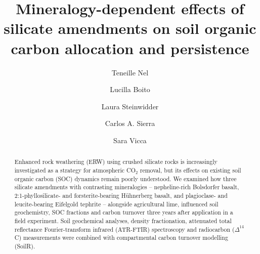 \documentclass[preprint,12pt]{elsarticle}
\begin{document}
\begin{frontmatter}

\title{Mineralogy-dependent effects of silicate amendments on soil organic carbon allocation and persistence}

\author[aff1]{Teneille Nel}

\author[aff1]{Lucilla Boito}

\author[aff1]{Laura Steinwidder}

\author[aff2]{Carlos A. Sierra}

\author[aff1]{Sara Vicca}

\address[aff1]{
    Department of Bioscience Engineering,
    University of Antwerp,
    Antwerp,
    Belgium
}

\address[aff2]{
    Theoretical Ecosystem Ecology Research Group,
    Max Planck Institute for Biogeochemistry,
    Jena,
    Germany
}


\begin{abstract}

Enhanced rock weathering (ERW) using crushed silicate rocks is increasingly investigated as a strategy for atmospheric CO$_2$ removal, but its effects on existing soil organic carbon (SOC) dynamics remain poorly understood. We examined how three silicate amendments with contrasting mineralogies – nepheline-rich Bolsdorfer basalt, 2:1-phyllosilicate- and forsterite-bearing H\"uhnerberg basalt, and plagioclase- and leucite-bearing Eifelgold tephrite – alongside agricultural lime, influenced soil geochemistry, SOC fractions and carbon turnover three years after application in a field experiment. Soil geochemical analyses, density fractionation, attenuated total reflectance Fourier-transform infrared (ATR-FTIR) spectroscopy and radiocarbon ($\Delta^{14}$C) measurements were combined with compartmental carbon turnover modelling (SoilR).


\end{abstract}
\end{frontmatter}
\end{document}
